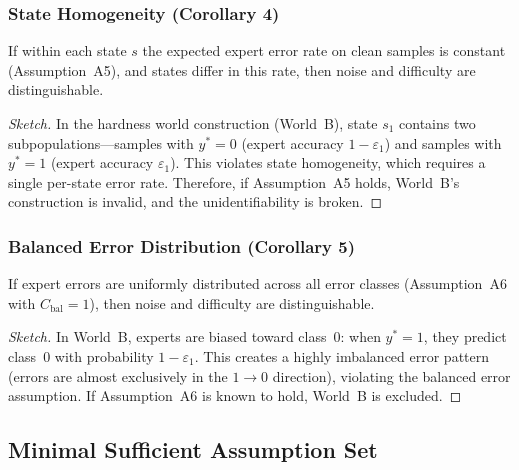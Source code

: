 \subsubsection{State Homogeneity (Corollary 4)}
\label{sec:corollary4}

\begin{corollary}
  If within each state $s$ the expected expert error rate on clean samples is
  constant (Assumption~A5), and states differ in this rate, then noise and
  difficulty are distinguishable.
\end{corollary}

\begin{proof}[Sketch]
  In the hardness world construction (World~B), state $s_1$ contains two
  subpopulations---samples with $y^*=0$ (expert accuracy $1-\varepsilon_1$)
  and samples with $y^*=1$ (expert accuracy $\varepsilon_1$).  This violates
  state homogeneity, which requires a single per-state error rate.
  Therefore, if Assumption~A5 holds, World~B's construction is invalid, and
  the unidentifiability is broken.
\end{proof}

\subsubsection{Balanced Error Distribution (Corollary 5)}
\label{sec:corollary5}

\begin{corollary}
  If expert errors are uniformly distributed across all error classes
  (Assumption~A6 with $C_{\text{bal}}=1$), then noise and difficulty are
  distinguishable.
\end{corollary}

\begin{proof}[Sketch]
  In World~B, experts are biased toward class~0: when $y^*=1$, they predict
  class~0 with probability $1-\varepsilon_1$.  This creates a highly
  imbalanced error pattern (errors are almost exclusively in the
  $1\to0$ direction), violating the balanced error assumption.  If
  Assumption~A6 is known to hold, World~B is excluded.
\end{proof}

\subsection{Minimal Sufficient Assumption Set}
\label{sec:thm3_minimal}


